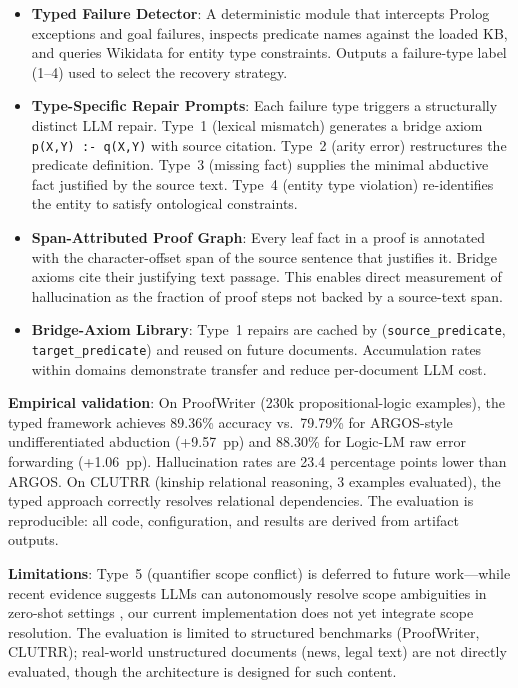 \documentclass[11pt,letterpaper]{article}
\begin{document}
\begin{itemize}
  \item \textbf{Typed Failure Detector}: A deterministic module that intercepts Prolog exceptions and goal failures, inspects predicate names against the loaded KB, and queries Wikidata for entity type constraints. Outputs a failure-type label (1--4) used to select the recovery strategy.

  \item \textbf{Type-Specific Repair Prompts}: Each failure type triggers a structurally distinct LLM repair. Type~1 (lexical mismatch) generates a bridge axiom \texttt{p(X,Y) :- q(X,Y)} with source citation. Type~2 (arity error) restructures the predicate definition. Type~3 (missing fact) supplies the minimal abductive fact justified by the source text. Type~4 (entity type violation) re-identifies the entity to satisfy ontological constraints.

  \item \textbf{Span-Attributed Proof Graph}: Every leaf fact in a proof is annotated with the character-offset span of the source sentence that justifies it. Bridge axioms cite their justifying text passage. This enables direct measurement of hallucination as the fraction of proof steps not backed by a source-text span.

  \item \textbf{Bridge-Axiom Library}: Type~1 repairs are cached by (\texttt{source\_predicate}, \texttt{target\_predicate}) and reused on future documents. Accumulation rates within domains demonstrate transfer and reduce per-document LLM cost.
\end{itemize}

\medskip\noindent\textbf{Empirical validation}: On ProofWriter (230k propositional-logic examples), the typed framework achieves 89.36\% accuracy vs.\ 79.79\% for ARGOS-style undifferentiated abduction (+9.57~pp) and 88.30\% for Logic-LM raw error forwarding (+1.06~pp). Hallucination rates are 23.4 percentage points lower than ARGOS. On CLUTRR (kinship relational reasoning, 3 examples evaluated), the typed approach correctly resolves relational dependencies. The evaluation is reproducible: all code, configuration, and results are derived from artifact outputs.

\medskip\noindent\textbf{Limitations}: Type~5 (quantifier scope conflict) is deferred to future work---while recent evidence suggests LLMs can autonomously resolve scope ambiguities in zero-shot settings \citep{Brassard2024}, our current implementation does not yet integrate scope resolution. The evaluation is limited to structured benchmarks (ProofWriter, CLUTRR); real-world unstructured documents (news, legal text) are not directly evaluated, though the architecture is designed for such content.
\end{document}
